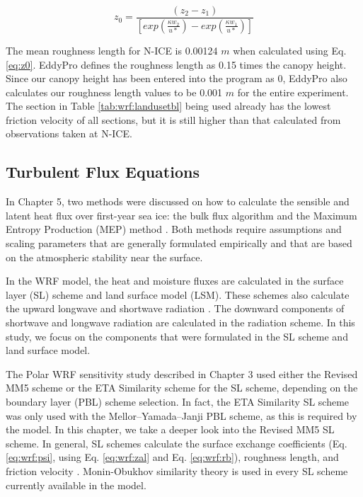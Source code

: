 \begin{equation}\label{eq:z0}
 z_{0} = \frac{(z_{2}-z_{1})}{[exp(\frac{\kappa w_{2}}{u*}) - exp(\frac{\kappa w_{1}}{u*})]} 
\end{equation}

The mean roughness length for N-ICE is 0.00124 $m$ when calculated using Eq. \ref{eq:z0}. EddyPro defines the roughness length as 0.15 times the canopy height. Since our canopy height has been entered into the program as 0, EddyPro also calculates our roughness length values to be 0.001 $m$ for the entire experiment. The section in Table \ref{tab:wrf:landusetbl} being used already has the lowest friction velocity of all sections, but it is still higher than that calculated from observations taken at N-ICE. 

\subsection{Turbulent Flux Equations}
In Chapter 5, two methods were discussed on how to calculate the sensible and latent heat flux over first-year sea ice: the bulk flux algorithm \citep{foken:2008} and the Maximum Entropy Production (MEP) method \citep{zhang:2021, wang:2014, wang:2009}. Both methods require assumptions and scaling parameters that are generally formulated empirically and that are based on the atmospheric stability near the surface. 

In the WRF model, the heat and moisture fluxes are calculated in the surface layer (SL) scheme and land surface model (LSM). These schemes also calculate the upward longwave and shortwave radiation \citep{dudhia:2014, skamarock:2019}. The downward components of shortwave and longwave radiation are calculated in the radiation scheme. In this study, we focus on the components that were formulated in the SL scheme and land surface model. 

The Polar WRF sensitivity study described in Chapter 3 used either the Revised MM5 scheme \citep{paulson:1970, dyer:1970, webb:1970, beljaars:1994} or the ETA Similarity scheme for the SL scheme, depending on the boundary layer (PBL) scheme selection. In fact, the ETA Similarity SL scheme was only used with the Mellor–Yamada–Janji PBL scheme, as this is required by the model. In this chapter, we take a deeper look into the Revised MM5 SL scheme. In general, SL schemes calculate the surface exchange coefficients (Eq. \ref{eq:wrf:psi}, using Eq. \ref{eq:wrf:zal} and Eq. \ref{eq:wrf:rb}), roughness length, and friction velocity \citep{dudhia:2014}. Monin-Obukhov similarity theory is used in every SL scheme currently available in the model. 

